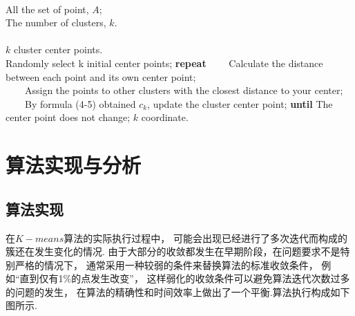 \documentclass[bachelor,adobefonts]{jnuthesis}
\begin{document}
  

\begin{algorithm}[htb]
  \caption{ $K-means$}   
  \label{alg:Framwork}   
  \begin{algorithmic}[1] %
  \REQUIRE ~~\\ %
  All the set of point, $A$;\\  
  The number of clusters, $k$.\\   
  \ENSURE ~~\\ %
  $k$ cluster center points.\\
  \STATE Randomly select k initial center points;    
  \STATE  \textbf{repeat} 
  \STATE \ \ \ \ Calculate the distance between each point and its own center point; \\
  \STATE \ \ \ \ Assign the points to other clusters with the closest distance to your center;
  \STATE \ \ \ \ By formula (4-5) obtained $c_k$, update the cluster center point;
  \STATE  \textbf{until}  The center point does not change;
  \RETURN $k$ coordinate. %
  \end{algorithmic}  
\end{algorithm}  


\section{算法实现与分析}
\subsection{算法实现}
在$K-means$算法的实际执行过程中，
可能会出现已经进行了多次迭代而构成的簇还在发生变化的情况.
由于大部分的收敛都发生在早期阶段，在问题要求不是特别严格的情况下，
通常采用一种较弱的条件来替换算法的标准收敛条件，
例如“直到仅有1\%的点发生改变”，
这样弱化的收敛条件可以避免算法迭代次数过多的问题的发生，
在算法的精确性和时间效率上做出了一个平衡.算法执行构成如下图所示.
\end{document}
